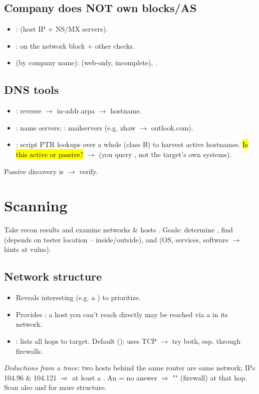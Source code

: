 \subsection{Company does NOT own blocks/AS}
\begin{itemize}
\item {}:  (host IP + NS/MX servers).
\item {}:  on the network block + other checks.
\item {} (by company name):  (web-only, incomplete), .
\end{itemize}

\subsection{DNS tools}
\begin{itemize}
\item {}: reverse $\to$ in-addr.arpa $\to$ hostname.
\item {}: name servers; : mailservers (e.g. zhaw $\to$ outlook.com).
\item {}: script PTR lookups over a whole  (class B) to harvest active hostnames. \hl{Is this active or passive?} $\to$  (you query , not the target's own systems).
\end{itemize}
 Passive discovery is  $\to$ verify.

\section{Scanning}
Take recon results and examine networks \& hosts . Goals: determine , find  (depends on tester location -- inside/outside), and  (OS, services, software $\to$ hints at vulns).

\subsection{Network structure}
\begin{itemize}
\item Reveals interesting  (e.g. a ) to prioritize.
\item Provides : a host you can't reach directly may be reached via a  in its network.
\item {}: lists all hops to target. Default  ();  uses TCP $\to$ try both, esp. through firewalls.
\end{itemize}
\textit{Deductions from a trace:} two hosts behind the same router are  same network; IPs 104.96 \& 104.121 $\Rightarrow$ at least a . An  = no answer $\Rightarrow$ "" (firewall) at that hop. Scan also  and  for more structure.

